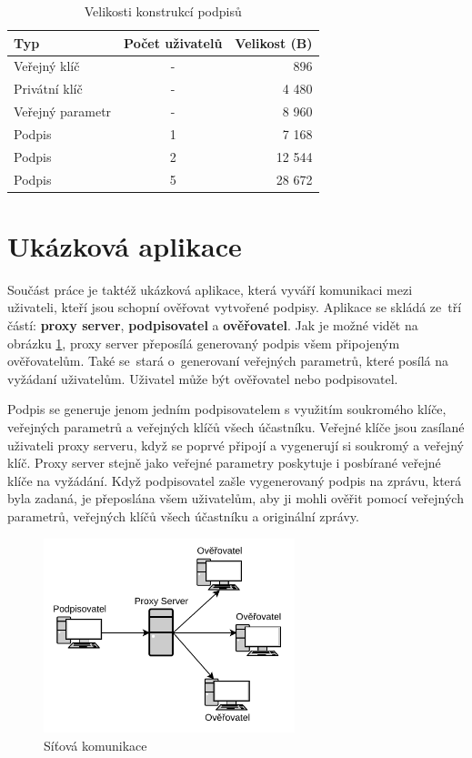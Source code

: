 \begin{table}[htbp]
  \centering
  \caption{Velikosti konstrukcí podpisů}
  \begin{tabular}{|l|c|r|}
    \hline
    Typ              & Počet uživatelů & Velikost (B) \\
    \hline
    Veřejný klíč     & -               & 896         \\
    Privátní klíč    & -               & 4 480        \\
    Veřejný parametr & -               & 8 960        \\
    Podpis           & 1               & 7 168        \\
    Podpis           & 2               & 12 544       \\
    Podpis           & 5               & 28 672       \\
    \hline
  \end{tabular}
  \label{sizes}
\end{table}


\section{Ukázková aplikace}
Součást práce je taktéž ukázková aplikace, která vyváří komunikaci mezi uživateli, kteří jsou schopní ověřovat vytvořené podpisy. Aplikace se skládá ze~tří částí: \textbf{proxy server}, \textbf{podpisovatel} a \textbf{ověřovatel}. Jak je možné vidět na obrázku \ref{network_diagram}, proxy server přeposílá generovaný podpis všem připojeným ověřovatelům. Také se~stará o~generovaní veřejných parametrů, které posílá na vyžádaní uživatelům. Uživatel může být ověřovatel nebo podpisovatel. 

Podpis se generuje jenom jedním podpisovatelem s využitím soukromého klíče, veřejných parametrů a veřejných klíčů všech účastníku. Veřejné klíče jsou zasílané uživateli proxy serveru, když se poprvé připojí a vygenerují si soukromý a veřejný klíč. Proxy server stejně jako veřejné parametry poskytuje i posbírané veřejné klíče na vyžádání. Když podpisovatel zašle vygenerovaný podpis na zprávu, která byla zadaná, je přeposlána všem uživatelům, aby ji mohli ověřit pomocí veřejných parametrů, veřejných klíčů všech účastníku a originální zprávy.

\begin{figure}[htbp]
  \centering
  \includegraphics[width=0.65\textwidth]{img/network_diagram.pdf}
  \caption{Síťová komunikace}
  \label{network_diagram}
\end{figure}

